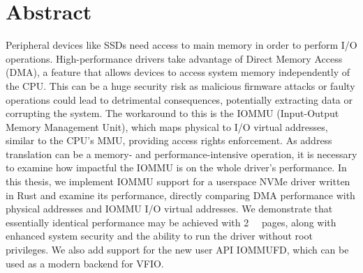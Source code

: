 \chapter{Abstract}

Peripheral devices like SSDs need access to main memory in order to perform I/O operations. High-performance drivers take advantage of Direct Memory Access (DMA), a feature that allows devices to access system memory independently of the CPU. This can be a huge security risk as malicious firmware attacks or faulty operations could lead to detrimental consequences, potentially extracting data or corrupting the system. The workaround to this is the IOMMU (Input-Output Memory Management Unit), which maps physical to I/O virtual addresses, similar to the CPU's MMU, providing access rights enforcement. As address translation can be a memory- and performance-intensive operation, it is necessary to examine how impactful the IOMMU is on the whole driver's performance.
In this thesis, we implement IOMMU support for a userspace NVMe driver written in Rust and examine its performance, directly comparing DMA performance with physical addresses and IOMMU I/O virtual addresses. We demonstrate that essentially identical performance may be achieved with \qty{2}{\mebi\byte} pages, along with enhanced system security and the ability to run the driver without root privileges. We also add support for the new user API IOMMUFD, which can be used as a modern backend for VFIO.